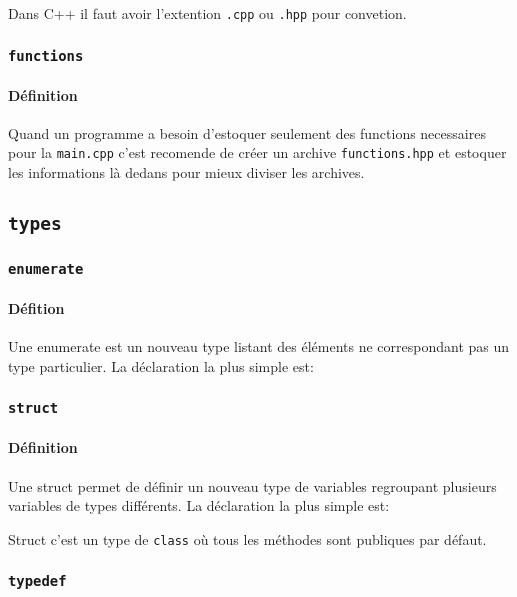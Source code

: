 \documentclass{article}
\begin{document}
\noindent Dans C++ il faut avoir l'extention \texttt{.cpp} ou \texttt{.hpp} pour convetion.

\subsubsection{\texttt{functions}}
\paragraph{Définition}Quand un programme a besoin d'estoquer seulement des functions necessaires pour la \texttt{main.cpp} c'est recomende de créer un archive \texttt{functions.hpp} et estoquer les informations là dedans pour mieux diviser les archives.
\subsection{\texttt{types}}
\subsubsection{\texttt{enumerate}}
\paragraph{Défition}Une enumerate est un nouveau type listant des éléments ne correspondant pas un type particulier. La déclaration la plus simple est:
\begin{scriptsize}
    \mycode
\end{scriptsize}

\subsubsection{\texttt{struct}}
\paragraph{Définition}Une struct permet de définir un nouveau type de variables regroupant plusieurs variables de types différents. La déclaration la plus simple est:
\begin{scriptsize}
    \mycode
\end{scriptsize}
Struct c'est un type de \texttt{class} où tous les méthodes sont publiques par défaut.

\subsubsection{\texttt{typedef}}
\end{document}
